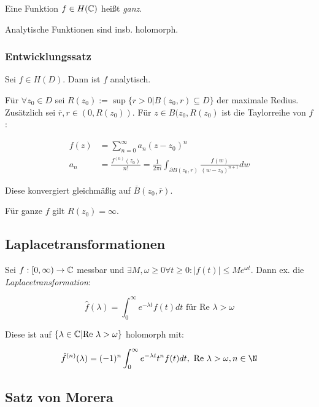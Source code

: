\vspace*{1mm}

Eine Funktion $f \in H(\mathbb{C})$ heißt \emph{ganz}.

\vspace*{1mm}

Analytische Funktionen sind insb. holomorph.

\subsubsection*{Entwicklungssatz}

Sei $f \in H(D)$. Dann ist $f$ analytisch.

\spacing

Für $\forall z_0 \in D$ sei $R(z_0) := \sup\{r > 0 | B(z_0,r) \subseteq D \}$ der maximale Redius. Zusätzlich sei $\overline r, r \in (0,R(z_0))$. Für $z \in B(z_0, R(z_0)$ ist die Taylorreihe von $f$:

\vspace*{-6mm}
\begin{align*}
f(z) &= \sum_{n=0}^\infty a_n(z-z_0)^n \\
a_n &= \frac{f^{(n)}(z_0)}{n!} = \frac{1}{2\pi i} \int_{\partial B(z_0,r)} \frac{f(w)}{(w-z_0)^{n+1}} dw
\end{align*}

Diese konvergiert gleichmäßig auf $\overline B(z_0,\overline r)$.

Für ganze $f$ gilt $R(z_0)=\infty$.

\subsection*{Laplacetransformationen}

Sei $f : [0,\infty) \to \mathbb{C}$ messbar und $\exists M, \omega \geq 0 \forall t \geq 0 : |f(t)| \leq Me^{\omega t}$. Dann ex. die \emph{Laplacetransformation}:

\vspace*{-2mm}
$$\hat f(\lambda) = \int_0^\infty e^{-\lambda t} f(t) dt \text{ für Re } \lambda > \omega$$

Diese ist auf $\{\lambda \in \mathbb{C} | \text{Re } \lambda > \omega\}$ holomorph mit:

\vspace*{-4mm}
$$\hat f^{(n)}(\lambda) = (-1)^n \int_0^\infty e^{-\lambda t} t^n f(t) dt, \text{ Re } \lambda > \omega, n \in \N$$

\subsection*{Satz von Morera}

